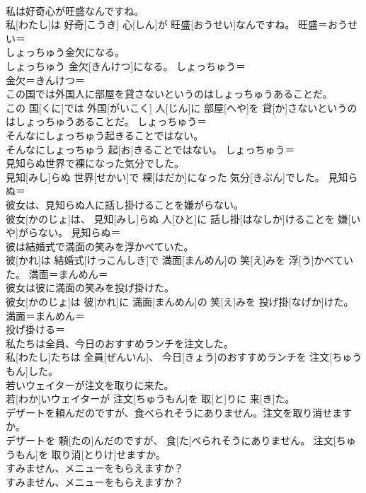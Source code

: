 \documentclass[8pt]{extreport}
\begin{document}
\begin{CJK}{UTF8}{min}
\\	私は好奇心が旺盛なんですね。	
\\	私[わたし]は 好奇[こうき] 心[しん]が 旺盛[おうせい]なんですね。	旺盛＝おうせい＝ 
\\	しょっちゅう金欠になる。	
\\	しょっちゅう 金欠[きんけつ]になる。	しょっちゅう＝ 
\\	金欠＝きんけつ＝ 
\\	この国では外国人に部屋を貸さないというのはしょっちゅうあることだ。	
\\	この 国[くに]では 外国[がいこく] 人[じん]に 部屋[へや]を 貸[か]さないというのはしょっちゅうあることだ。	しょっちゅう＝ 
\\	そんなにしょっちゅう起きることではない。	
\\	そんなにしょっちゅう 起[お]きることではない。	しょっちゅう＝ 
\\	見知らぬ世界で裸になった気分でした。	
\\	見知[みし]らぬ 世界[せかい]で 裸[はだか]になった 気分[きぶん]でした。	見知らぬ＝ 
\\	彼女は、見知らぬ人に話し掛けることを嫌がらない。	
\\	彼女[かのじょ]は、 見知[みし]らぬ 人[ひと]に 話し掛[はなしか]けることを 嫌[いや]がらない。	見知らぬ＝ 
\\	彼は結婚式で満面の笑みを浮かべていた。	
\\	彼[かれ]は 結婚式[けっこんしき]で 満面[まんめん]の 笑[え]みを 浮[う]かべていた。	満面＝まんめん＝ 
\\	彼女は彼に満面の笑みを投げ掛けた。	
\\	彼女[かのじょ]は 彼[かれ]に 満面[まんめん]の 笑[え]みを 投げ掛[なげか]けた。	満面＝まんめん＝ 
\\	投げ掛ける＝ 
\\	私たちは全員、今日のおすすめランチを注文した。	
\\	私[わたし]たちは 全員[ぜんいん]、 今日[きょう]のおすすめランチを 注文[ちゅうもん]した。	
\\	若いウェイターが注文を取りに来た。	
\\	若[わか]いウェイターが 注文[ちゅうもん]を 取[と]りに 来[き]た。	
\\	デザートを頼んだのですが、食べられそうにありません。注文を取り消せますか。	
\\	デザートを 頼[たの]んだのですが、 食[た]べられそうにありません。 注文[ちゅうもん]を 取り消[とりけ]せますか。	
\\	すみません、メニューをもらえますか？	
\\	すみません、メニューをもらえますか？	

\end{CJK}
\end{document}
